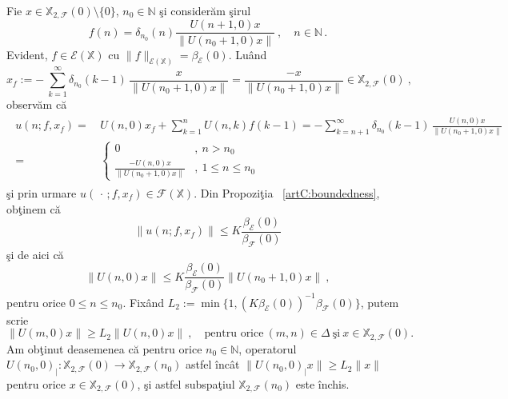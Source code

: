 \documentclass[ a4paper, 12pt]{report}
\newcommand{\E}{\mathcal{E}}
\newcommand{\F}{\mathcal{F}}
\newcommand{\N}{\mathbb{N}}
\newcommand{\X}{\mathbb{X}}
\theoremstyle{definition}
\theoremstyle{remark}
\numberwithin{equation}{section}
\begin{document}
Fie $x\in\X_{2,\F}(0)\setminus\{0\}$, $n_0\in\N$ \c si consider\u am \c sirul
\begin{equation}
f(n)=\delta_{n_0}(n) \frac{U(n+1,0)x}{\|U(n_0+1,0)x\|}\ ,\quad n\in\N\,.
\end{equation}
Evident, $f\in\E(\X)$ cu $\|f\|_{\E(\X)}=\beta_{\E}(0)$.
Lu\^and
\begin{equation}
x_f:= -\ \sum_{k=1}^{\infty}\delta_{n_0}(k-1) \,\frac{x}{\|U(n_0+1,0)x\|} = \frac{-x}{\|U(n_0+1,0)x\|}\in \X_{2,\F}(0)\ ,
\end{equation}
observ\u am c\u a
\begin{gather}
\begin{split}
u(n;f,x_f)=&\, U(n,0)x_f +\sum_{k=1}^{n} U(n,k)f(k-1)=
 -  \sum_{k=n+1}^{\infty}\delta_{n_0}(k-1)\,\frac{U(n,0)x}{\|U(n_0+1,0)x\|}\\
 =&\, \begin{cases}
 0 &,\ n>n_0\\
 \frac{-U(n,0)x}{\|U(n_0+1,0)x\|} &,\ 1\leq n\leq n_0
 \end{cases}
\end{split}
\end{gather}
\c si prin urmare $u(\,\cdot\,;f,x_f)\in \F(\X)$. Din Propozi\c tia ~\ref{artC:boundedness}, ob\c tinem c\u a
$$ \|u(n;f,x_f)\|\leq K\frac{\beta_{\E}(0)}{\beta_{\F}(0)}$$
\c si de aici c\u a
$$ \|U(n,0)x\|\leq K\frac{\beta_{\E}(0)}{\beta_{\F}(0)} \|U(n_0+1,0)x\|\ ,$$
pentru orice $0\leq n\leq n_0$. Fix\^and $L_2:=\min\{1,{(K\beta_{\E}(0))}^{-1}{\beta_{\F}(0)}\}$, putem scrie
\begin{equation}
\|U(m,0)x\|\geq L_2\|U(n,0)x\|\ ,\quad \text{pentru orice}\ (m,n)\in\Delta\ \text{\c si}\ x\in\X_{2,\F}(0).
\end{equation}
Am ob\c tinut deasemenea c\u a pentru orice $n_0\in\N$, operatorul
$U(n_0,0)_{|}:\X_{2,\F}(0)\to\X_{2,\F}(n_0)$ astfel \^inc\^at $\|U(n_0,0)_{|}x\|\geq L_2\|x\|$ pentru orice
$x\in\X_{2,\F}(0)$, \c si astfel subspa\c tiul $\X_{2,\F}(n_0)$ este \^inchis.
\end{document}
